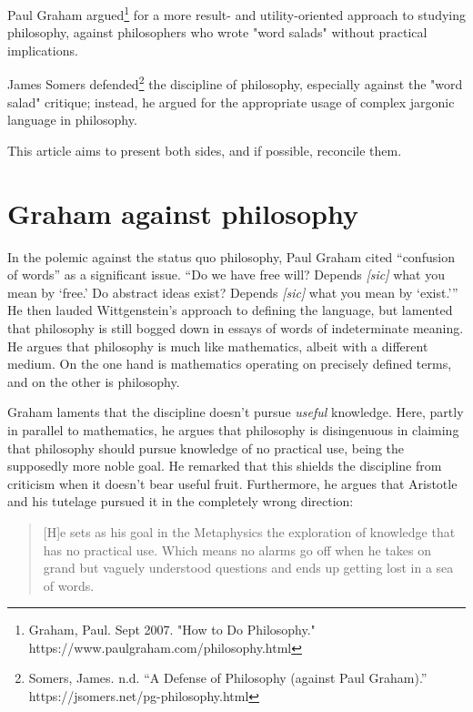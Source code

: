 \documentclass[12pt]{article}
\begin{document}



\begin{preamble}
 Paul Graham argued\footnote{Graham, Paul. Sept 2007. "How to Do Philosophy." https://www.paulgraham.com/philosophy.html} for a more result- and utility-oriented approach to studying philosophy, against philosophers who wrote  "word salads" without practical implications.

 James Somers defended\footnote{Somers, James. n.d. \enquote{A Defense of Philosophy (against Paul Graham).} https://jsomers.net/pg-philosophy.html} the discipline of philosophy, especially against the "word salad" critique; instead, he argued for the appropriate usage of complex jargonic language in philosophy.

 This article aims to present both sides, and if possible, reconcile them.
\end{preamble}

\section{Graham against philosophy}

In the polemic against the status quo philosophy, Paul Graham cited \enquote{confusion of words} as a significant issue. \enquote{Do we have free will? Depends \emph{[sic]} what you mean by \enquote{free.} Do abstract ideas exist? Depends \emph{[sic]} what you mean by \enquote{exist.}} He then lauded Wittgenstein's approach to defining the language, but lamented that philosophy is still bogged down in essays of words of indeterminate meaning. He argues that philosophy is much like mathematics, albeit with a different medium. On the one hand is mathematics operating on precisely defined terms, and on the other is philosophy.

Graham laments that the discipline doesn't pursue \emph{useful} knowledge. Here, partly in parallel to mathematics, he argues that philosophy is disingenuous in claiming that philosophy should pursue knowledge of no practical use, being the supposedly more noble goal. He remarked that this shields the discipline from criticism when it doesn't bear useful fruit. Furthermore, he argues that Aristotle and his tutelage pursued it in the completely wrong direction:

\begin{quotation}
 [H]e sets as his goal in the Metaphysics the exploration of knowledge that has no practical use. Which means no alarms go off when he takes on grand but vaguely understood questions and ends up getting lost in a sea of words.
\end{quotation}
\end{document}
